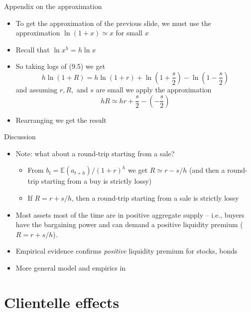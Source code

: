\documentclass[english,10pt
,aspectratio=169
]{beamer}
\begin{document}
\begin{frame}{Appendix on the approximation}
	\begin{itemize}
		\item To get the approximation of the previous slide, we must use the approximation $\ln (1+x) \simeq x$ for small $x$
		\item Recall that $\ln x^h = h \ln x$
		\item So taking logs of (9.5) we get
		\[
		h \ln (1+R) = h\ln (1+r) + \ln \left(1+\frac{s}{2} \right) - \ln \left( 1-\frac{s}{2} \right) 
		\]
		and assuming $r, R,$ and $s$ are small we apply the approximation
		\[
		hR \simeq hr+\frac{s}{2}- \left(-\frac{s}{2}\right)
		\]
		\item Rearranging we get the result
	\end{itemize}
\end{frame}


\begin{frame}{Discussion}
	\begin{itemize}
		\item Note: what about a round-trip starting from a sale?
		\begin{itemize}
			\item From $b_t=\mathbb{E}(a_{t+h})/(1+r)^h$ we get $R \simeq r-s/h$ (and then a round-trip starting from a buy is strictly lossy)
			\item If $R = r + s/h$, then a round-trip starting from a sale is strictly lossy
		\end{itemize}
		\item Most assets most of the time are in positive aggregate supply -- i.e., buyers have the bargaining power and can demand a positive liquidity premium ($R = r + s/h$).
		\item Empirical evidence confirms \emph{positive} liquidity premium for stocks, bonds
		\item More general model and empirics in \citet*{bongaerts_derivative_2011}
	\end{itemize}
\end{frame}



\section{Clientelle effects}
\end{document}
